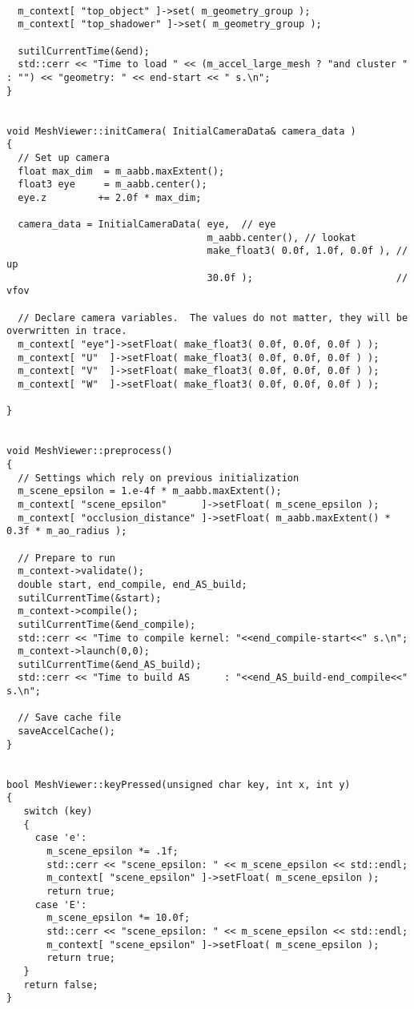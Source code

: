 \begin{verbatim}
  
  m_context[ "top_object" ]->set( m_geometry_group );
  m_context[ "top_shadower" ]->set( m_geometry_group );

  sutilCurrentTime(&end);
  std::cerr << "Time to load " << (m_accel_large_mesh ? "and cluster " : "") << "geometry: " << end-start << " s.\n";
}


void MeshViewer::initCamera( InitialCameraData& camera_data )
{
  // Set up camera
  float max_dim  = m_aabb.maxExtent();
  float3 eye     = m_aabb.center();
  eye.z         += 2.0f * max_dim;

  camera_data = InitialCameraData( eye,  // eye
                                   m_aabb.center(), // lookat
                                   make_float3( 0.0f, 1.0f, 0.0f ), // up
                                   30.0f );                         // vfov

  // Declare camera variables.  The values do not matter, they will be overwritten in trace.
  m_context[ "eye"]->setFloat( make_float3( 0.0f, 0.0f, 0.0f ) );
  m_context[ "U"  ]->setFloat( make_float3( 0.0f, 0.0f, 0.0f ) );
  m_context[ "V"  ]->setFloat( make_float3( 0.0f, 0.0f, 0.0f ) );
  m_context[ "W"  ]->setFloat( make_float3( 0.0f, 0.0f, 0.0f ) );

}


void MeshViewer::preprocess()
{
  // Settings which rely on previous initialization
  m_scene_epsilon = 1.e-4f * m_aabb.maxExtent();
  m_context[ "scene_epsilon"      ]->setFloat( m_scene_epsilon );
  m_context[ "occlusion_distance" ]->setFloat( m_aabb.maxExtent() * 0.3f * m_ao_radius );

  // Prepare to run 
  m_context->validate();
  double start, end_compile, end_AS_build;
  sutilCurrentTime(&start);
  m_context->compile();
  sutilCurrentTime(&end_compile);
  std::cerr << "Time to compile kernel: "<<end_compile-start<<" s.\n";
  m_context->launch(0,0);
  sutilCurrentTime(&end_AS_build);
  std::cerr << "Time to build AS      : "<<end_AS_build-end_compile<<" s.\n";

  // Save cache file
  saveAccelCache();
}


bool MeshViewer::keyPressed(unsigned char key, int x, int y)
{
   switch (key)
   {
     case 'e':
       m_scene_epsilon *= .1f;
       std::cerr << "scene_epsilon: " << m_scene_epsilon << std::endl;
       m_context[ "scene_epsilon" ]->setFloat( m_scene_epsilon );
       return true;
     case 'E':
       m_scene_epsilon *= 10.0f;
       std::cerr << "scene_epsilon: " << m_scene_epsilon << std::endl;
       m_context[ "scene_epsilon" ]->setFloat( m_scene_epsilon );
       return true;
   }
   return false;
}


\end{verbatim}

